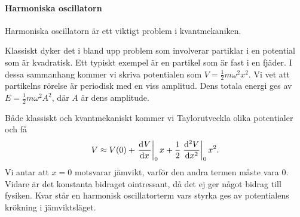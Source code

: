 \paragraph{Harmoniska oscillatorn}
Harmoniska oscillatorn är ett viktigt problem i kvantmekaniken.

Klassiskt dyker det i bland upp problem som involverar partiklar i en potential som är kvadratisk. Ett typiskt exempel är en partikel som är fast i en fjäder. I dessa sammanhang kommer vi skriva potentialen som $V = \frac{1}{2}m\omega^{2}x^{2}$. Vi vet att partikelns rörelse är periodisk med en viss amplitud. Dens totala energi ges av $E = \frac{1}{2}m\omega^{2}A^{2}$, där $A$ är dens amplitude.

Både klassiskt och kvantmekaniskt kommer vi Taylorutveckla olika potentialer och få
\begin{align*}
	V \approx V(0) + \deval{V}{x}{0}x + \frac{1}{2}\deval[2]{V}{x}{0}x^{2}.
\end{align*}
Vi antar att $x = 0$ motsvarar jämvikt, varför den andra termen måste vara $0$. Vidare är det konstanta bidraget ointressant, då det ej ger något bidrag till fysiken. Kvar står en harmonisk oscillatorterm vars styrka ges av potentialens krökning i jämviktsläget.